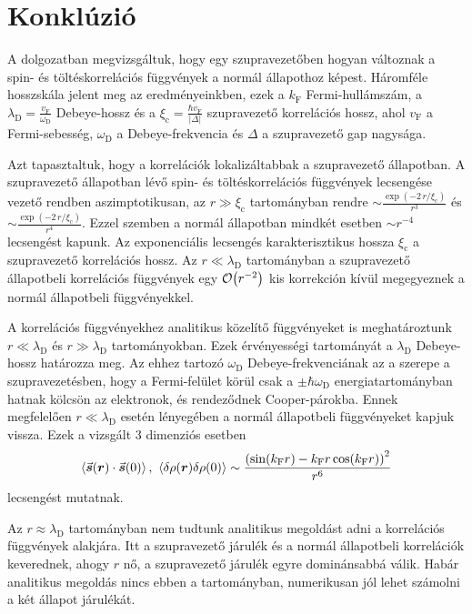 \documentclass[a4paper,12pt,titlepage]{article}
\newcommand{\RR}{{\vb*{r}}}
\newcommand{\kF}{{k_\text{F}}}
\newcommand{\vF}{{v_\text{F}}}
\newcommand{\xic}{{\xi_\text{c}}}
\begin{document}
\section{Konklúzió}

A dolgozatban megvizsgáltuk, hogy egy szupravezetőben hogyan változnak a spin- és töltéskorrelációs függvények a normál állapothoz képest.  Háromféle hosszskála jelent meg az eredményeinkben, ezek a $\kF$ Fermi-hullámszám, a $\lambda_\text{D} = \frac{\vF}{\omega_\text{D}}$ Debeye-hossz és a $\xic = \frac{\hbar \vF}{\left| \Delta \right|}$ szupravezető korrelációs hossz, ahol $\vF$ a Fermi-sebesség, $\omega_\text{D}$ a Debeye-frekvencia és $\Delta$ a szupravezető gap nagysága.

Azt tapasztaltuk, hogy a korrelációk lokalizáltabbak a szupravezető állapotban.  A szupravezető állapotban lévő spin- és töltéskorrelációs függvények lecsengése vezető rendben aszimptotikusan, az $r \gg \xic$ tartományban rendre $\sim \frac{\exp(-2 \, r / \xic)}{r^3}$ és $\sim \frac{\exp(-2 \, r / \xic)}{r^4}$.  Ezzel szemben a normál állapotban mindkét esetben $\sim r^{-4}$ lecsengést kapunk.  Az exponenciális lecsengés karakterisztikus hossza $\xic$ a szupravezető korrelációs hossz.  Az $r \ll \lambda_\text{D}$ tartományban a szupravezető állapotbeli korrelációs függvények egy $\order{r^{-2}}$ kis korrekción kívül megegyeznek a normál állapotbeli függvényekkel.

A korrelációs függvényekhez analitikus közelítő függvényeket is meghatároztunk $r \ll \lambda_\text{D}$ és $r \gg \lambda_\text{D}$ tartományokban.  Ezek érvényességi tartományát a $\lambda_\text{D}$ Debeye-hossz határozza meg.  Az ehhez tartozó $\omega_\text{D}$ Debeye-frekvenciának az a szerepe a szupravezetésben, hogy a Fermi-felület körül csak a $\pm \hbar \omega_\text{D}$ energiatartományban hatnak kölcsön az elektronok, és rendeződnek Cooper-párokba.  Ennek megfelelően $r \ll \lambda_\text{D}$ esetén lényegében a normál állapotbeli függvényeket kapjuk vissza.  Ezek a vizsgált 3 dimenziós esetben
$$ \expval{\va*{s}(\RR) \cdot \va*{s}(0)}, \ \expval{\delta\rho(\RR) \delta\rho(0)} \sim \frac{\left( \sin(\kF r) - \kF r \cos(\kF r) \right)^2}{r^6} $$
lecsengést mutatnak.

Az $r \approx \lambda_\text{D}$ tartományban nem tudtunk analitikus megoldást adni a korrelációs függvények alakjára.  Itt a szupravezető járulék és a normál állapotbeli korrelációk keverednek, ahogy $r$ nő, a szupravezető járulék egyre dominánsabbá válik.  Habár analitikus megoldás nincs ebben a tartományban, numerikusan jól lehet számolni a két állapot járulékát.
\end{document}
